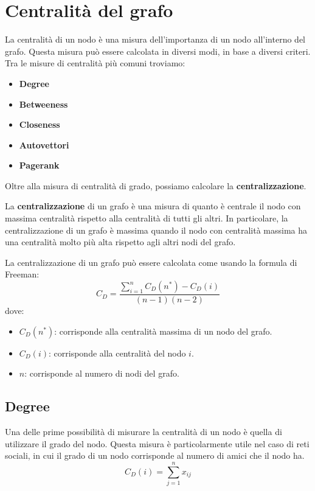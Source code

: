 \section{Centralità del grafo}
La centralità di un nodo è una misura dell'importanza di un nodo all'interno
del grafo. Questa misura può essere calcolata in diversi modi, in base a
diversi criteri. Tra le misure di centralità più comuni troviamo:
\begin{itemize}
    \item \textbf{Degree}
    \item \textbf{Betweeness}
    \item \textbf{Closeness}
    \item \textbf{Autovettori}
    \item \textbf{Pagerank}
\end{itemize}
Oltre alla misura di centralità di grado, possiamo calcolare la \textbf{centralizzazione}.
\begin{definizione}
    La \textbf{centralizzazione} di un grafo è una misura di quanto è centrale il
    nodo con massima centralità rispetto alla centralità di tutti gli altri.
    In particolare, la centralizzazione
    di un grafo è massima quando il nodo con centralità massima ha una centralità molto più alta
    rispetto agli altri nodi del grafo.
\end{definizione}

La centralizzazione di un grafo può essere calcolata come usando la formula di Freeman:
\begin{equation}
    C_D = \frac{\sum_{i=1}^{n} C_D(n^\ast) - C_D(i)}{(n - 1)(n - 2)}
\end{equation}
dove:
\begin{itemize}
    \item $C_D(n^\ast)$: corrisponde alla centralità massima di un nodo del grafo.
    \item $C_D(i)$: corrisponde alla centralità del nodo $i$.
    \item $n$: corrisponde al numero di nodi del grafo.
\end{itemize}
\subsection{Degree}
Una delle prime possibilità di misurare la centralità di un nodo è quella di
utilizzare il grado del nodo. Questa misura è particolarmente utile nel caso di
reti sociali, in cui il grado di un nodo corrisponde al numero di amici che
il nodo ha.
\begin{equation}
    C_D(i) = \sum_{j=1}^{n} x_{ij}
\end{equation}

